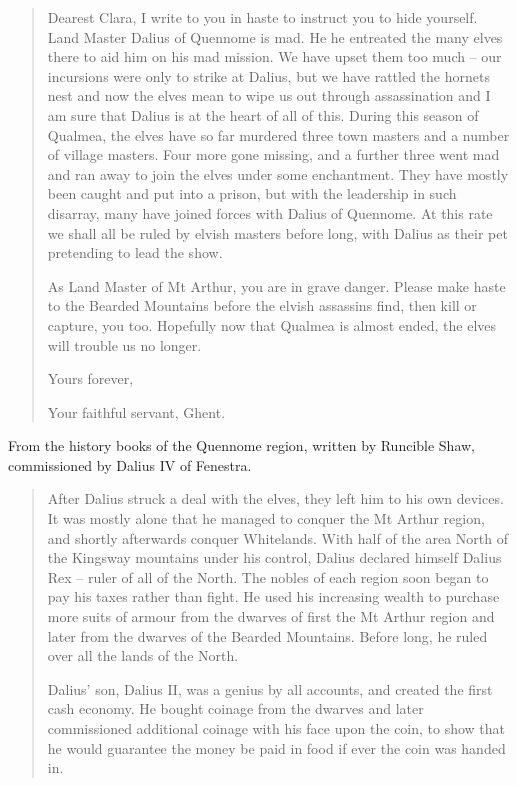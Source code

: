 \begin{multicols}{2}
\begin{quotation}
	Dearest Clara, I write to you in haste to instruct you to hide yourself.
	Land Master Dalius of Quennome is mad.
	He he entreated the many elves there to aid him on his mad mission.
	We have upset them too much -- our incursions were only to strike at Dalius, but we have rattled the hornets nest and now the elves mean to wipe us out through assassination and I am sure that Dalius is at the heart of all of this.
	During this season of Qualmea, the elves have so far murdered three town masters and a number of village masters.
	Four more gone missing, and a further three went mad and ran away to join the elves under some enchantment.
	They have mostly been caught and put into a prison, but with the leadership in such disarray, many have joined forces with Dalius of Quennome.
	At this rate we shall all be ruled by elvish masters before long, with Dalius as their pet pretending to lead the show.

	As Land Master of Mt Arthur, you are in grave danger.
	Please make haste to the Bearded Mountains before the elvish assassins find, then kill or capture, you too.
	Hopefully now that Qualmea is almost ended, the elves will trouble us no longer.

	Yours forever,

	Your faithful servant, Ghent.

\end{quotation}

From the history books of the Quennome region, written by Runcible Shaw, commissioned by Dalius IV of Fenestra.

\begin{quotation}

	After Dalius struck a deal with the elves, they left him to his own devices.
	It was mostly alone that he managed to conquer the Mt Arthur region, and shortly afterwards conquer Whitelands.
	With half of the area North of the Kingsway mountains under his control, Dalius declared himself Dalius Rex -- ruler of all of the North.
	The nobles of each region soon began to pay his taxes rather than fight.
	He used his increasing wealth to purchase more suits of armour from the dwarves of first the Mt Arthur region and later from the dwarves of the Bearded Mountains.
	Before long, he ruled over all the lands of the North.

	Dalius' son, Dalius II, was a genius by all accounts, and created the first cash economy.
	He bought coinage from the dwarves and later commissioned additional coinage with his face upon the coin, to show that he would guarantee the money be paid in food if ever the coin was handed in.


\end{quotation}
\end{multicols}
